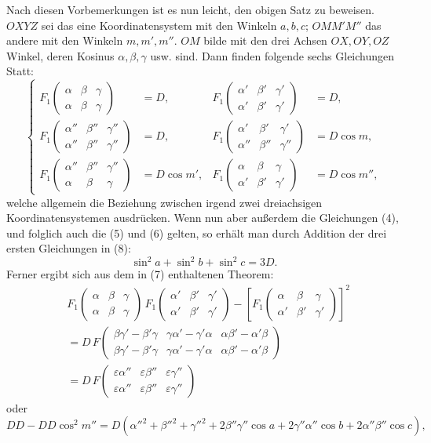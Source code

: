 \documentclass[11pt]{article}
\newcommand{\ffone}[6]{F_1\!\left(\begin{array}{ccc}#1&#2&#3\\#4&#5&#6\end{array}\right)}
\begin{document}
Nach diesen Vorbemerkungen ist es nun leicht, den obigen Satz zu beweisen. $OXYZ$ sei das eine Koordinatensystem mit den Winkeln $a,b,c$; $OMM'M''$ das andere mit den Winkeln $m,m',m''$. $OM$ bilde mit den drei Achsen $OX,OY,OZ$ Winkel, deren Kosinus $\alpha,\beta,\gamma$ usw. sind. Dann finden folgende sechs Gleichungen Statt:
\begin{equation}
\left\{
\begin{aligned}
\ffone{\alpha}{\beta}{\gamma}{\alpha}{\beta}{\gamma}&=D, &
\ffone{\alpha'}{\beta'}{\gamma'}{\alpha'}{\beta'}{\gamma'}&=D,\\
\ffone{\alpha''}{\beta''}{\gamma''}{\alpha''}{\beta''}{\gamma''}&=D, &
\ffone{\alpha'}{\beta'}{\gamma'}{\alpha''}{\beta''}{\gamma''}&=D\cos m,\\
\ffone{\alpha''}{\beta''}{\gamma''}{\alpha}{\beta}{\gamma}&=D\cos m', &
\ffone{\alpha}{\beta}{\gamma}{\alpha'}{\beta'}{\gamma'}&=D\cos m'',
\end{aligned}\right.
\tag{8}
\end{equation}
welche allgemein die Beziehung zwischen irgend zwei dreiachsigen Koordinatensystemen ausdrücken. Wenn nun aber außerdem die Gleichungen (4), und folglich auch die (5) und (6) gelten, so erhält man durch Addition der drei ersten Gleichungen in (8):
\begin{equation}
\sin^2a+\sin^2b+\sin^2c=3D.
\tag{9}
\end{equation}
Ferner ergibt sich aus dem in (7) enthaltenen Theorem:
\[
\begin{aligned}
&\ffone{\alpha}{\beta}{\gamma}{\alpha}{\beta}{\gamma}\,
 \ffone{\alpha'}{\beta'}{\gamma'}{\alpha'}{\beta'}{\gamma'}
 -\left[\ffone{\alpha}{\beta}{\gamma}{\alpha'}{\beta'}{\gamma'}\right]^2\\
&=D\,F\!\left(\begin{array}{ccc}
\beta\gamma'-\beta'\gamma&\gamma\alpha'-\gamma'\alpha&\alpha\beta'-\alpha'\beta\\
\beta\gamma'-\beta'\gamma&\gamma\alpha'-\gamma'\alpha&\alpha\beta'-\alpha'\beta
\end{array}\right)\\
&=D\,F\!\left(\begin{array}{ccc}
\varepsilon\alpha''&\varepsilon\beta''&\varepsilon\gamma''\\
\varepsilon\alpha''&\varepsilon\beta''&\varepsilon\gamma''
\end{array}\right)
\end{aligned}
\]
oder
\[
DD-DD\cos^2m''
=D(\alpha''^2+\beta''^2+\gamma''^2+2\beta''\gamma''\cos a+2\gamma''\alpha''\cos b+2\alpha''\beta''\cos c),
\]
\end{document}

